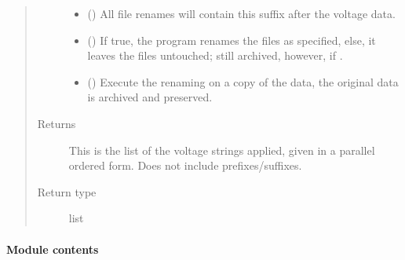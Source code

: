 \documentclass[letterpaper,10pt,english]{sphinxmanual}
\begin{document}
\begin{fulllineitems}
\begin{quote}
\begin{description}
\begin{itemize}
\item {} 
 (\sphinxstyleliteralemphasis{\sphinxupquote{ (}}\sphinxstyleliteralemphasis{\sphinxupquote{)}}) \textendash{} All file renames will contain this suffix after the voltage data.

\item {} 
 (\sphinxstyleliteralemphasis{\sphinxupquote{ (}}\sphinxstyleliteralemphasis{\sphinxupquote{)}}) \textendash{} If true, the program renames the files as specified, else, it leaves
the files untouched; still archived, however, if .

\item {} 
 (\sphinxstyleliteralemphasis{\sphinxupquote{ (}}\sphinxstyleliteralemphasis{\sphinxupquote{)}}) \textendash{} Execute the renaming on a copy of the data, the original data
is archived and preserved.

\end{itemize}

\item[{Returns}] \leavevmode
{} \textendash{} This is the list of the voltage strings applied, given in a parallel
ordered form. Does not include prefixes/suffixes.

\item[{Return type}] \leavevmode
list

\end{description}\end{quote}

\end{fulllineitems}



\paragraph{Module contents}
\label{\detokenize{python_docstrings/IfA_Smeargle.bravo:module-IfA_Smeargle.bravo}}\label{\detokenize{python_docstrings/IfA_Smeargle.bravo:module-contents}}
\end{document}
